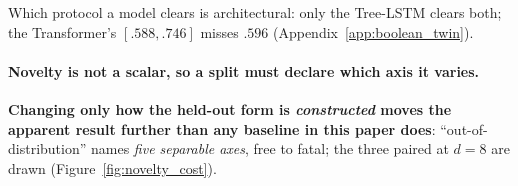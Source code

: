 Which protocol a model clears is architectural: only the Tree-LSTM clears both; the Transformer's $[.588,.746]$ misses $.596$ (Appendix~\ref{app:boolean_twin}).

\paragraph{Novelty is not a scalar, so a split must declare which axis it varies.}
\label{sec:loso}
\label{sec:coverage}
\label{sec:robustness}
%
\textbf{Changing only how the held-out form is \emph{constructed} moves the apparent result further than any baseline in this paper does}: ``out-of-distribution'' names \emph{five separable axes}, free to fatal; the three paired at $d{=}8$ are drawn (Figure~\ref{fig:novelty_cost}).

